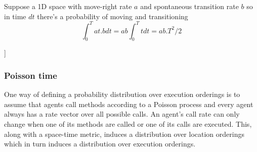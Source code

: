 \documentclass[a4paper]{article}
\begin{document}
Suppose a 1D space with move-right rate $a$ and spontaneous transition rate $b$ so in time $dt$ there's a probability of moving and transitioning
\[
\int_0^T a t. b dt = ab \int_0^T t dt = ab. T^2/2
\]

]

\subsubsection{Poisson time}

One way of defining a probability distribution over execution orderings is to assume that agents call methods according to a Poisson process and every agent always has a rate vector over all possible calls. An agent's call rate can only change when one of its methods are called or one of its calls are executed. This, along with a space-time metric, induces a distribution over location orderings which in turn induces a distribution over execution orderings.
\end{document}
